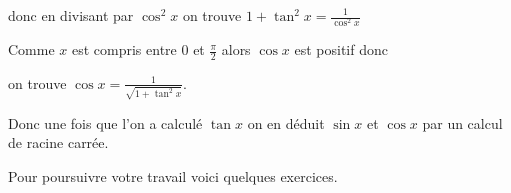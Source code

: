 donc en divisant par $\cos^2 x$ on trouve 
$1+\tan^2 x = \frac{1}{\cos^2 x}$

\change

Comme $x$ est compris entre $0$ et $\frac \pi2$ alors
$\cos x$ est positif donc

on trouve $\cos x = \frac{1}{\sqrt{1+\tan^2 x}}$.

Donc une fois que l'on a calculé $\tan x$ on en déduit $\sin x$ et $\cos x$ par un calcul de racine carrée.



\diapo

Pour poursuivre votre travail voici quelques exercices.


